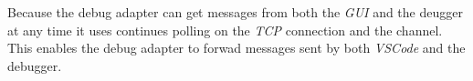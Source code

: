 Because the debug adapter can get messages from both the \emph{GUI} and the deugger at any time it uses continues polling on the \emph{TCP} connection and the channel.
This enables the debug adapter to forwad messages sent by both \emph{VSCode} and the debugger.

